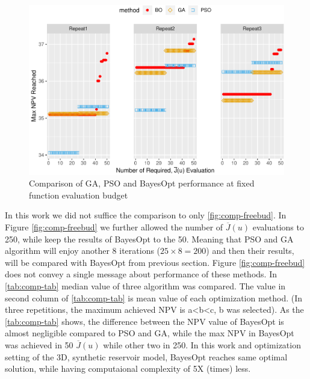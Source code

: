 \documentclass[]{elsarticle} %
\begin{document}
\begin{eqution}
\begin{figure}

{\centering \includegraphics[width=0.9\linewidth]{0_Paper1_main_files/figure-latex/comp-fixbud-1} 

}

\caption{Comparison of GA, PSO and BayesOpt performance at fixed function evaluation budget}\label{fig:comp-fixbud}
\end{figure}

In this work we did not suffice the comparison to only \ref{fig:comp-freebud}. In Figure \ref{fig:comp-freebud} we further allowed the number of \(\overline{J}(u)\) evaluations to 250, while keep the results of BayesOpt to the 50. Meaning that PSO and GA algorithm will enjoy another 8 iterations (\(25\times8=200\)) and then their results, will be compared with BayesOpt from previous section. Figure \ref{fig:comp-freebud} does not convey a single message about performance of these methods. In \ref{tab:comp-tab} median value of three algorithm was compared. The value in second column of \ref{tab:comp-tab} is mean value of each optimization method. (In three repetitions, the maximum achieved NPV is a\textless b\textless c, b was selected). As the \ref{tab:comp-tab} shows, the difference between the NPV value of BayesOpt is almost negligible compared to PSO and GA, while the max NPV in BayesOpt was achieved in 50 \(\overline{J}(u)\) while other two in 250. In this work and optimization setting of the 3D, synthetic reservoir model, BayesOpt reaches same optimal solution, while having computaional complexity of 5X (times) less.

\begin{figure}


\end{figure}
\end{eqution}
\end{document}
